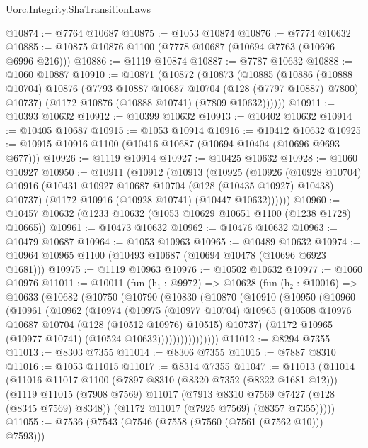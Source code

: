 \begin{lexlean}{Uorc.Integrity.ShaTransitionLaws}
\begin{coremodule}
@10874 := @7764 @10687
@10875 := @1053 @10874
@10876 := @7774 @10632
@10885 := @10875 @10876 @1100 (@7778 @10687 (@10694 @7763 (@10696 @6996 @216)))
@10886 := @1119 @10874
@10887 := @7787 @10632
@10888 := @1060 @10887
@10910 := @10871
    (@10872
      (@10873
        (@10885
          (@10886
            (@10888 @10704)
            @10876
            (@7793 @10887 @10687 @10704 (@128 (@7797 @10887) @7800) @10737)
            (@1172 @10876 (@10888 @10741) (@7809 @10632))))))
@10911 := @10393 @10632
@10912 := @10399 @10632
@10913 := @10402 @10632
@10914 := @10405 @10687
@10915 := @1053 @10914
@10916 := @10412 @10632
@10925 := @10915 @10916 @1100 (@10416 @10687 (@10694 @10404 (@10696 @9693 @677)))
@10926 := @1119 @10914
@10927 := @10425 @10632
@10928 := @1060 @10927
@10950 := @10911
    (@10912
      (@10913
        (@10925
          (@10926
            (@10928 @10704)
            @10916
            (@10431 @10927 @10687 @10704 (@128 (@10435 @10927) @10438) @10737)
            (@1172 @10916 (@10928 @10741) (@10447 @10632))))))
@10960 := @10457 @10632 (@1233 @10632 (@1053 @10629 @10651 @1100 (@1238 @1728) @10665))
@10961 := @10473 @10632
@10962 := @10476 @10632
@10963 := @10479 @10687
@10964 := @1053 @10963
@10965 := @10489 @10632
@10974 := @10964 @10965 @1100 (@10493 @10687 (@10694 @10478 (@10696 @6923 @1681)))
@10975 := @1119 @10963
@10976 := @10502 @10632
@10977 := @1060 @10976
@11011 := @10011
    (fun (h₁ : @9972) =>
    @10628
      (fun (h₂ : @10016) =>
      @10633
        (@10682
          (@10750
            (@10790
              (@10830
                (@10870
                  (@10910
                    (@10950
                      (@10960
                        (@10961
                          (@10962
                            (@10974
                              (@10975
                                (@10977 @10704)
                                @10965
                                (@10508 @10976 @10687 @10704 (@128 (@10512 @10976) @10515) @10737)
                                (@1172 @10965 (@10977 @10741) (@10524 @10632))))))))))))))))
@11012 := @8294 @7355
@11013 := @8303 @7355
@11014 := @8306 @7355
@11015 := @7887 @8310
@11016 := @1053 @11015
@11017 := @8314 @7355
@11047 := @11013
    (@11014
      (@11016
        @11017
        @1100
        (@7897 @8310 (@8320 @7352 (@8322 @1681 @12)))
        (@1119
          @11015
          (@7908 @7569)
          @11017
          (@7913 @8310 @7569 @7427 (@128 (@8345 @7569) @8348))
          (@1172 @11017 (@7925 @7569) (@8357 @7355)))))
@11055 := @7536 (@7543 (@7546 (@7558 (@7560 (@7561 (@7562 @10))) @7593)))

\end{coremodule}
\end{lexlean}
